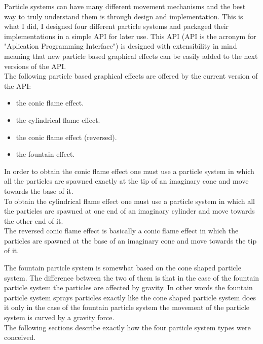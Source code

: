 Particle systems can have many different movement mechanisms and the best way to truly understand them is through design and implementation. This is what I did, I designed four different particle systems and packaged their implementations in a simple API for later use. This API (API is the acronym for "Aplication Programming Interface") is designed with extensibility in mind meaning that new particle based graphical effects can be easily added to the next versions of the API.\\

The following particle based graphical effects are offered by the current version of the API:

\begin{itemize}
	\item the conic flame effect.
	
	\item the cylindrical flame effect.
	
	\item the conic flame effect (reversed).
	
	\item the fountain effect.
\end{itemize}

In order to obtain the conic flame effect one must use a particle system in which all the particles are spawned exactly at the tip of an imaginary cone and move towards the base of it.\\

To obtain the cylindrical flame effect one must use a particle system in which all the particles are spawned at one end of an imaginary cylinder and move towards the other end of it.\\

The reversed conic flame effect is basically a conic flame effect in which the particles are spawned at the base of an imaginary cone and move towards the tip of it.

The fountain particle system is somewhat based on the cone shaped particle system. The difference between the two of them is that in the case of the fountain particle system the particles are affected by gravity. In other words the fountain particle system sprays particles exactly like the cone shaped particle system does it only in the case of the fountain particle system the movement of the particle system is curved by a gravity force.\\

The following sections describe exactly how the four particle system types were conceived.\\

